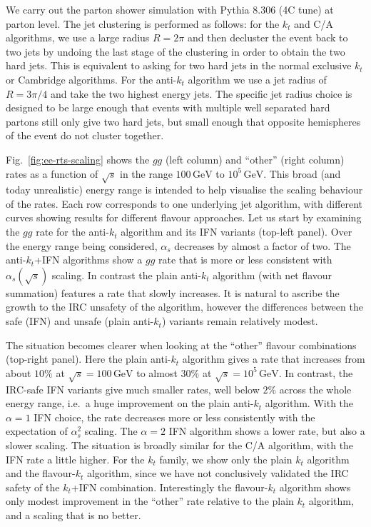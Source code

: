 \documentclass[nofootinbib,twocolumn,preprintnumbers,superscriptaddress,aps]{revtex4-2}
\newcommand{\as}{\alpha_s}
\newcommand{\GeV}{\,\text{GeV}}
\newcommand{\logbook}[2]{}
\begin{document}
  
We carry out the parton shower simulation with Pythia 8.306 (4C
tune) at parton level. 
% 
The jet clustering is performed as follows: for the $k_t$ and C/A
algorithms, we use a large radius $R=2\pi$ and then decluster the
event back to two jets by undoing the last stage of the clustering in
order to obtain the two hard jets.
%
This is equivalent to asking for two hard jets in the normal exclusive
$k_t$ or Cambridge algorithms.
%
For the anti-$k_t$ algorithm we use a jet radius of $R=3\pi/4$ and
take the two highest energy jets.
%
The specific jet radius choice is designed to be large enough that
events with multiple well separated hard partons still only give two
hard jets, but small enough that opposite hemispheres of the event do not
cluster together.



Fig.~\ref{fig:ee-rts-scaling} shows the $gg$ (left column) and
``other'' (right column) rates as a function of $\sqrt{s}$ in the
range $100\GeV$ to $10^5\GeV$.
%
This broad (and today unrealistic) energy range is intended to help
visualise the scaling behaviour of the rates.
%
Each row corresponds to one underlying jet algorithm, with different
curves showing results for different flavour approaches.
%
Let us start by examining the $gg$ rate for the anti-$k_t$ algorithm
and its IFN variants (top-left panel).
%
Over the energy range being considered, $\as$ decreases by almost a
factor of two.
%
\logbook{}{
  # alphas values for variable flavour-number scheme
  # so MC would be a bit different
  alphas(91.1876) = 0.117900
  alphas(1e+04) = 0.060433 (3-loops), 0.061168 (2-loops)
  }%
%
The anti-$k_t$+IFN algorithms show a $gg$ rate that is more or less
consistent with $\as(\sqrt{s})$ scaling.
%
In contrast the plain anti-$k_t$ algorithm (with net flavour
summation) features a rate that slowly increases.
%
It is natural to ascribe the growth to the IRC unsafety of the
algorithm, however the differences between the safe (IFN) and unsafe
(plain anti-$k_t$) variants remain relatively modest.

The situation becomes clearer when looking at the ``other''
flavour combinations (top-right panel).
%
Here the plain anti-$k_t$ algorithm gives a rate that increases from
about $10\%$ at $\sqrt{s}=100\GeV$ to almost $30\%$ at $\sqrt{s} =
10^5\GeV$.
%
In contrast, the IRC-safe IFN variants give much smaller rates, well
below $2\%$ across the whole energy range, i.e.\ a huge improvement on
the plain anti-$k_t$ algorithm.
%
With the $\alpha=1$ IFN choice, the rate decreases more or less
consistently with the expectation of $\as^2$ scaling.
%
The $\alpha=2$ IFN algorithm shows a lower rate, but also a slower scaling.
% 
The situation is broadly similar for the C/A algorithm, with the IFN
rate a little higher.
%
For the $k_t$ family, we show only the plain $k_t$ algorithm and the
flavour-$k_t$ algorithm, since we have not conclusively validated the
IRC safety of the $k_t$+IFN combination.
%
Interestingly the flavour-$k_t$ algorithm shows only modest
improvement in the ``other'' rate relative to the plain $k_t$
algorithm, and a scaling that is no better.
\end{document}

